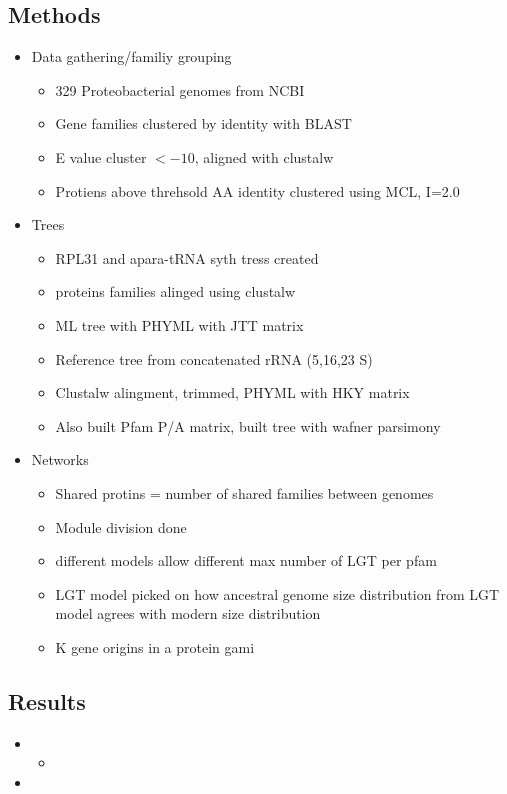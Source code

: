 \documentclass[10pt,letter]{article}
\begin{document}
\subsection*{Methods}
\begin{itemize}
    \item Data gathering/familiy grouping
    \begin{itemize}
        \item 329 Proteobacterial genomes from NCBI
        \item Gene families clustered by identity with BLAST
        \item E value cluster $< -10$, aligned with clustalw
        \item Protiens above threhsold AA identity clustered using MCL, I=2.0
    \end{itemize}
    \item Trees
    \begin{itemize}
        \item RPL31 and apara-tRNA syth tress created
        \item proteins families alinged using clustalw
        \item ML tree with PHYML with JTT matrix
        \item Reference tree from concatenated rRNA (5,16,23 S)
        \item Clustalw alingment, trimmed, PHYML with HKY matrix
        \item Also built Pfam P/A matrix, built tree with wafner parsimony
    \end{itemize}
    \item Networks
    \begin{itemize}
        \item Shared protins = number of shared families between genomes
        \item Module division done
        \item different models allow different max number of LGT per pfam
        \item LGT model picked on how ancestral genome size distribution from LGT model agrees with modern size distribution
        \item K gene origins in a protein gami
    \end{itemize}
\end{itemize}
\subsection*{Results}
\begin{itemize}
    \item
    \begin{itemize}
        \item
    \end{itemize}
    \item
\end{itemize}
\end{document}
